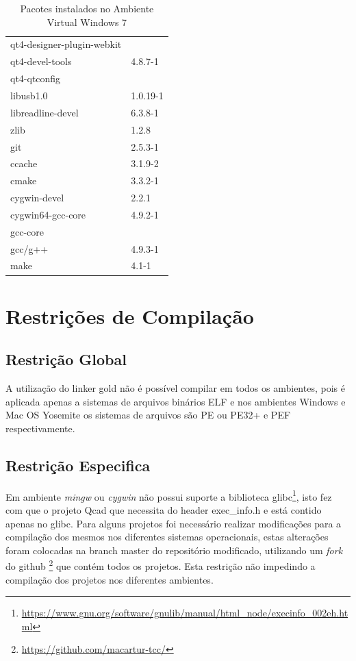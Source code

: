 \begin{itemize}
\begin{table}[h]
\begin{tabular}{ll}
qt4-designer-plugin-webkit  & \\
qt4-devel-tools & 4.8.7-1 \\ 
qt4-qtconfig & \\ \midrule

libusb1.0 & 1.0.19-1 \\ \midrule


libreadline-devel & 6.3.8-1 \\ \midrule

zlib & 1.2.8 \\ \midrule
git & 2.5.3-1 \\ \midrule
ccache & 3.1.9-2 \\ \midrule
cmake & 3.3.2-1 \\ \midrule
cygwin-devel & 2.2.1 \\ \midrule
cygwin64-gcc-core & 4.9.2-1 \\ \midrule
gcc-core & \\ \midrule
gcc/g++ & 4.9.3-1 \\ 
make & 4.1-1 \\ \bottomrule
\end{tabular} 
\caption{Pacotes instalados no Ambiente Virtual Windows 7}
\label{pacotes_instalados_windows}
\end{table}

\end{itemize}



\section{Restrições de Compilação}

\subsection{Restrição Global}
    A utilização do linker gold não é possível compilar em todos os ambientes,
 pois é aplicada apenas a sistemas de arquivos binários ELF e nos ambientes
 Windows e Mac OS Yosemite os sistemas de arquivos são PE ou PE32+ e PEF 
respectivamente.

\subsection{Restrição Especifica}
    Em ambiente \textit{mingw} ou \textit{cygwin} não possui suporte
 a biblioteca glibc\footnote{
\url{https://www.gnu.org/software/gnulib/manual/html\_node/execinfo\_002eh.html}},
 isto fez com que o projeto Qcad que necessita do header exec\_info.h e
 está contido apenas no glibc.
    Para alguns projetos foi necessário realizar modificações para a compilação
 dos mesmos nos diferentes sistemas operacionais,
estas alterações foram colocadas na branch master do repositório modificado,
utilizando um \textit{fork} do github
\footnote{\url{https://github.com/macartur-tcc/}} que contém todos os projetos.
 Esta restrição não impedindo a compilação dos projetos nos diferentes ambientes.




